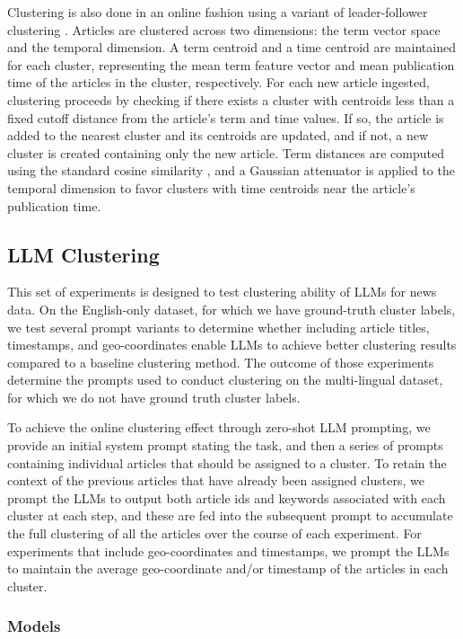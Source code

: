 Clustering is also done in an online fashion using a variant of leader-follower clustering \cite{Duda73}. 
Articles are clustered across two dimensions: the term vector space and the temporal dimension. 
A term centroid and a time centroid are maintained for each cluster, representing the mean term feature vector and mean publication time of the articles in the cluster, respectively. 
For each new article ingested, clustering proceeds by checking if there exists a cluster with centroids less than a fixed cutoff distance from the article's term and time values. 
If so, the article is added to the nearest cluster and its centroids are updated, and if not, a new cluster is created containing only the new article. 
Term distances are computed using the standard cosine similarity \cite{steinbach}, and a Gaussian attenuator is applied to the temporal dimension to favor clusters with time centroids near the article's publication time.



\subsection{LLM Clustering}

This set of experiments is designed to test clustering ability of LLMs for news data.
On the English-only dataset, for which we have ground-truth cluster labels, we test several prompt variants to determine whether including article titles, timestamps, and geo-coordinates enable LLMs to achieve better clustering results compared to a baseline clustering method.
The outcome of those experiments determine the prompts used to conduct clustering on the multi-lingual dataset, for which we do not have ground truth cluster labels.

To achieve the online clustering effect through zero-shot LLM prompting, we provide an initial system prompt stating the task, and then a series of prompts containing individual articles that should be assigned to a cluster.
To retain the context of the previous articles that have already been assigned clusters, we prompt the LLMs to output both article ids and keywords associated with each cluster at each step, and these are fed into the subsequent prompt to accumulate the full clustering of all the articles over the course of each experiment.
For experiments that include geo-coordinates and timestamps, we prompt the LLMs to maintain the average geo-coordinate and/or timestamp of the articles in each cluster.

\subsubsection{Models}

